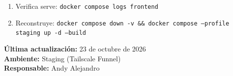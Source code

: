 \documentclass[11pt]{article}
\begin{document}
\begin{enumerate}
\item Verifica serve: \texttt{docker compose logs frontend}
\item Reconstruye: \texttt{docker compose down -v \&\& docker compose --profile staging up -d --build}
\end{enumerate}

\vspace{2cm}

\begin{center}
\textbf{Última actualización:} 23 de octubre de 2026 \\
\textbf{Ambiente:} Staging (Tailscale Funnel) \\
\textbf{Responsable:} Andy Alejandro
\end{center}
\end{document}
